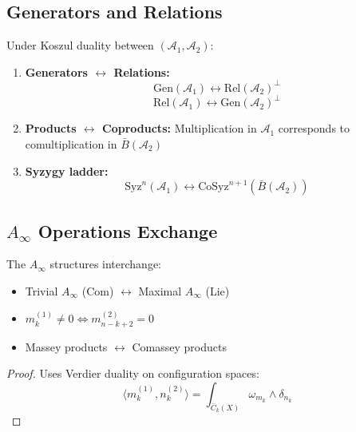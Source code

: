 \subsection{Generators and Relations}

\begin{theorem}
Under Koszul duality between $(\mathcal{A}_1, \mathcal{A}_2)$:
\begin{enumerate}
\item \textbf{Generators $\leftrightarrow$ Relations:}
$$\text{Gen}(\mathcal{A}_1) \leftrightarrow \text{Rel}(\mathcal{A}_2)^{\perp}$$
$$\text{Rel}(\mathcal{A}_1) \leftrightarrow \text{Gen}(\mathcal{A}_2)^{\perp}$$

\item \textbf{Products $\leftrightarrow$ Coproducts:}
Multiplication in $\mathcal{A}_1$ corresponds to comultiplication in $\bar{B}(\mathcal{A}_2)$

\item \textbf{Syzygy ladder:}
$$\text{Syz}^n(\mathcal{A}_1) \leftrightarrow \text{CoSyz}^{n+1}(\bar{B}(\mathcal{A}_2))$$
\end{enumerate}
\end{theorem}

\subsection{$A_\infty$ Operations Exchange}

\begin{theorem}
The $A_\infty$ structures interchange:
\begin{itemize}
\item Trivial $A_\infty$ (Com) $\leftrightarrow$ Maximal $A_\infty$ (Lie)
\item $m_k^{(1)} \neq 0 \Leftrightarrow m_{n-k+2}^{(2)} = 0$
\item Massey products $\leftrightarrow$ Comassey products
\end{itemize}
\end{theorem}

\begin{proof}
Uses Verdier duality on configuration spaces:
$$\langle m_k^{(1)}, n_k^{(2)} \rangle = \int_{\overline{C}_k(X)} \omega_{m_k} \wedge \delta_{n_k}$$
\end{proof}


